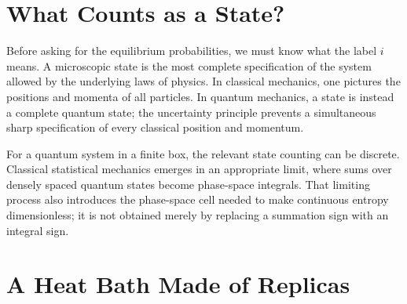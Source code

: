 \begin{classroomqa}
\end{classroomqa}

\section{What Counts as a State?}

Before asking for the equilibrium probabilities, we must know what the label
\(i\) means. A microscopic state is the most complete specification of the
system allowed by the underlying laws of physics. In classical mechanics,
one pictures the positions and momenta of all particles. In quantum
mechanics, a state is instead a complete quantum state; the uncertainty
principle prevents a simultaneous sharp specification of every classical
position and momentum.

For a quantum system in a finite box, the relevant state counting can be
discrete. Classical statistical mechanics emerges in an appropriate limit,
where sums over densely spaced quantum states become phase-space integrals.
That limiting process also introduces the phase-space cell needed to make
continuous entropy dimensionless; it is not obtained merely by replacing a
summation sign with an integral sign.

\begin{classroomqa}
\end{classroomqa}

\section{A Heat Bath Made of Replicas}

